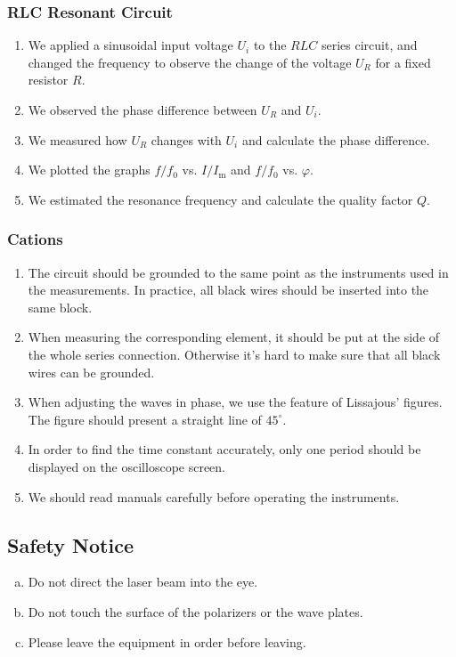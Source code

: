\documentclass[a4paper]{article}
\begin{document}
\subsubsection{RLC Resonant Circuit}

\begin{enumerate}
	\item We applied a sinusoidal input voltage $U_i$ to the $RLC$ series circuit, and changed the frequency to observe the change of the voltage $U_R$ for a fixed resistor $R$.
	\item We observed the phase difference between $U_R$ and $U_i$.
	\item We measured how $U_R$ changes with $U_i$ and calculate the phase difference.
	\item We plotted the graphs $f/f_0$ vs. $I/I_\text{m}$ and $f/f_0$ vs. $\varphi$.
	\item We estimated the resonance frequency and calculate the quality factor $Q$.
\end{enumerate}

\subsubsection{Cations}

\begin{enumerate}
	\item The circuit should be grounded to the same point as the instruments used in the measurements. In practice, all black wires should be inserted into the same block.
	\item When measuring the corresponding element, it should be put at the side of the whole series connection. Otherwise it's hard to make sure that all black wires can be grounded.
	\item When adjusting the waves in phase, we use the feature of Lissajous' figures. The figure should present a straight line of $45^\circ$.
	\item In order to find the time constant accurately, only one period should be displayed on the oscilloscope screen.
	\item We should read manuals carefully before operating the instruments.
\end{enumerate}


\subsection{Safety Notice}

\begin{enumerate}[a.]
	\item Do not direct the laser beam into the eye.
	\item Do not touch the surface of the polarizers or the wave plates.
	\item Please leave the equipment in order before leaving.
\end{enumerate}
\end{document}
